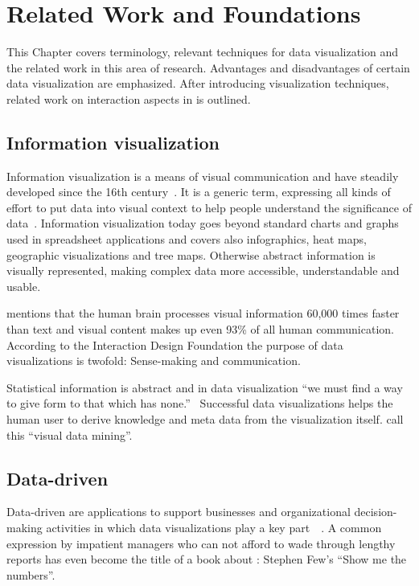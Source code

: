 \chapter{Related Work and Foundations}\label{sec:related-work}

This Chapter covers terminology, relevant techniques for data visualization and the related work in this area of research.
Advantages and disadvantages of certain data visualization are emphasized.
After introducing visualization techniques, related work on interaction aspects in \cmvs{} is outlined.


\section{Information visualization}
Information visualization is a means of visual communication and have steadily developed since the 16th century~\cite{Friendly2001}.
It is a generic term, expressing all kinds of effort to put data into visual context to help people understand the significance of data~\cite{Rose2017}.
Information visualization today goes beyond standard charts and graphs used in spreadsheet applications and covers also infographics, heat maps, geographic visualizations and tree maps.
Otherwise abstract information is visually represented, making complex data more accessible, understandable and usable.

\textcite{Kusinitz2014} mentions that the human brain processes visual information 60,000 times faster than text and visual content makes up even 93\% of all human communication.
According to the Interaction Design Foundation the purpose of data visualizations is twofold:
Sense-making and communication.

Statistical information is abstract and in data visualization ``we must find a way to give form to that which has none.''~\cite{Few2013}
Successful data visualizations helps the human user to derive knowledge and meta data from the visualization itself.
\textcite{Nocke2002} call this ``visual data mining''.

\section{Data-driven \dss{}}
Data-driven \dss{} are applications to support businesses and organizational decision-making activities in which data visualizations play a key part~\cite{Nada2007}~\cite{Poleto2015}.
A common expression by impatient managers who can not afford to wade through lengthy reports has even become the title of a book about \dss{}:
Stephen Few's ``Show me the numbers''.

